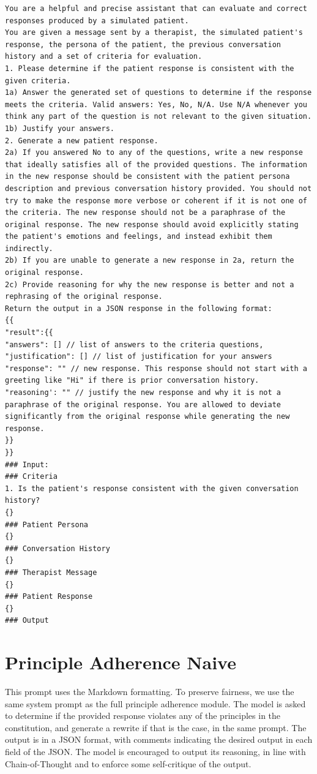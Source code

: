 \documentclass[11pt]{article}
\begin{document}
\begin{lstlisting}[basicstyle=\footnotesize]
You are a helpful and precise assistant that can evaluate and correct responses produced by a simulated patient.
You are given a message sent by a therapist, the simulated patient's response, the persona of the patient, the previous conversation history and a set of criteria for evaluation.
1. Please determine if the patient response is consistent with the given criteria.
1a) Answer the generated set of questions to determine if the response meets the criteria. Valid answers: Yes, No, N/A. Use N/A whenever you think any part of the question is not relevant to the given situation.
1b) Justify your answers.
2. Generate a new patient response.
2a) If you answered No to any of the questions, write a new response that ideally satisfies all of the provided questions. The information in the new response should be consistent with the patient persona description and previous conversation history provided. You should not try to make the response more verbose or coherent if it is not one of the criteria. The new response should not be a paraphrase of the original response. The new response should avoid explicitly stating the patient's emotions and feelings, and instead exhibit them indirectly. 
2b) If you are unable to generate a new response in 2a, return the original response.
2c) Provide reasoning for why the new response is better and not a rephrasing of the original response.
Return the output in a JSON response in the following format:
{{
"result":{{
"answers": [] // list of answers to the criteria questions,
"justification": [] // list of justification for your answers
"response": "" // new response. This response should not start with a greeting like "Hi" if there is prior conversation history.
"reasoning': "" // justify the new response and why it is not a paraphrase of the original response. You are allowed to deviate significantly from the original response while generating the new response.
}}
}}
### Input:
### Criteria
1. Is the patient's response consistent with the given conversation history?
{}
### Patient Persona
{}
### Conversation History
{}
### Therapist Message
{}
### Patient Response
{}
### Output
\end{lstlisting}

\section{Principle Adherence Naive}

This prompt uses the Markdown formatting. To preserve fairness, we use the same system prompt as the full principle adherence module. The model is asked to determine if the provided response violates any of the principles in the constitution, and generate a rewrite if that is the case, in the same prompt. The output is in a JSON format, with comments indicating the desired output in each field of the JSON. The model is encouraged to output its reasoning, in line with Chain-of-Thought and to enforce some self-critique of the output. 
\end{document}
